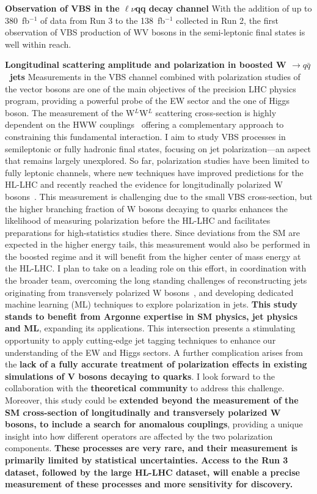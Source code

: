 {\begin{flushleft}
\textbf{Observation of VBS in the $\ell\nu$qq decay channel} With the addition of up to 380~fb$^{-1}$ of data from Run 3 to the 138~fb$^{-1}$ collected in Run 2, the first observation of VBS production of WV bosons in the semi-leptonic final states is well within reach.

\textbf{Longitudinal scattering amplitude and polarization in boosted W $\to q\bar{q}$ \ jets}
Measurements in the VBS channel combined with polarization studies of the vector bosons are one of the main objectives of the precision LHC physics program, providing a powerful probe of the EW sector and the one of Higgs boson.
The measurement of the  W$^L$W$^L$ scattering cross-section is highly dependent on the HWW couplings~\cite{[7]} offering a complementary approach to constraining this fundamental interaction.
I aim to study VBS processes in semileptonic or fully hadronic final states, focusing on jet polarization—an aspect that remains largely unexplored. So far, polarization studies have been limited to fully leptonic channels, where new techniques have improved predictions for the HL-LHC and recently reached the evidence for longitudinally polarized W bosons~\cite{[8]}. This measurement is challenging due to the small VBS cross-section, but the higher branching fraction of W bosons decaying to quarks enhances the likelihood of measuring polarization before the HL-LHC and facilitates preparations for high-statistics studies there. Since deviations from the SM are expected in the higher energy tails, this measurement would also be performed in the boosted regime and it will benefit from the higher center of mass energy at the HL-LHC. I plan to take on a leading role on this effort, in coordination with the broader team, overcoming the long standing challenges of reconstructing jets originating from transversely polarized W bosons~\cite{[9]}, and developing dedicated machine learning (ML) techniques to explore polarization in jets.
\textbf{This study stands to benefit from Argonne expertise in SM physics, jet physics and ML}, expanding its applications. This intersection presents a stimulating opportunity to apply cutting-edge jet tagging techniques to enhance our understanding of the EW and Higgs sectors.
A further complication arises from the {\bf lack of a fully accurate treatment of polarization effects in existing simulations of V bosons decaying to quarks}. I look forward to the collaboration with the {\bf theoretical community} to address this challenge.  
Moreover, this study could be {\bf extended beyond the measurement of the SM cross-section of longitudinally and transversely polarized W bosons, to include a search for anomalous couplings}, providing a unique insight into how different operators are affected by the two polarization components.
{\bf These processes are very rare, and their measurement is primarily limited by statistical uncertainties. Access to the Run 3 dataset, followed by the large HL-LHC dataset, will enable a precise measurement of these processes and more sensitivity for discovery.}


\end{flushleft}}
